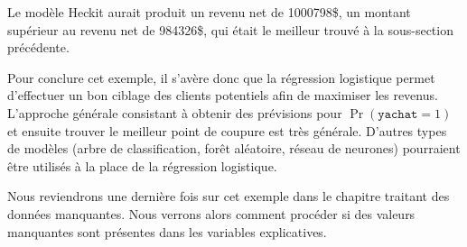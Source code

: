 \documentclass[
  11pt,
  letterpaper,
]{scrbook}
\newenvironment{Shaded}{\begin{snugshade}}{\end{snugshade}}
\newcommand{\AttributeTok}[1]{\textcolor[rgb]{0.40,0.45,0.13}{#1}}
\newcommand{\CommentTok}[1]{\textcolor[rgb]{0.37,0.37,0.37}{#1}}
\newcommand{\DecValTok}[1]{\textcolor[rgb]{0.68,0.00,0.00}{#1}}
\newcommand{\FunctionTok}[1]{\textcolor[rgb]{0.28,0.35,0.67}{#1}}
\newcommand{\NormalTok}[1]{\textcolor[rgb]{0.00,0.23,0.31}{#1}}
\newcommand{\OtherTok}[1]{\textcolor[rgb]{0.00,0.23,0.31}{#1}}
\newcommand{\SpecialCharTok}[1]{\textcolor[rgb]{0.37,0.37,0.37}{#1}}
\newcommand{\StringTok}[1]{\textcolor[rgb]{0.13,0.47,0.30}{#1}}
\theoremstyle{definition}
\theoremstyle{remark}
\begin{document}
\begin{Shaded}
\end{Shaded}

Le modèle Heckit aurait produit un revenu net de 1000798\$, un montant
supérieur au revenu net de 984326\$, qui était le meilleur trouvé à la
sous-section précédente.

Pour conclure cet exemple, il s'avère donc que la régression logistique
permet d'effectuer un bon ciblage des clients potentiels afin de
maximiser les revenus. L'approche générale consistant à obtenir des
prévisions pour \(\Pr(\texttt{yachat}=1)\) et ensuite trouver le
meilleur point de coupure est très générale. D'autres types de modèles
(arbre de classification, forêt aléatoire, réseau de neurones)
pourraient être utilisés à la place de la régression logistique.

Nous reviendrons une dernière fois sur cet exemple dans le chapitre
traitant des données manquantes. Nous verrons alors comment procéder si
des valeurs manquantes sont présentes dans les variables explicatives.
\end{document}
